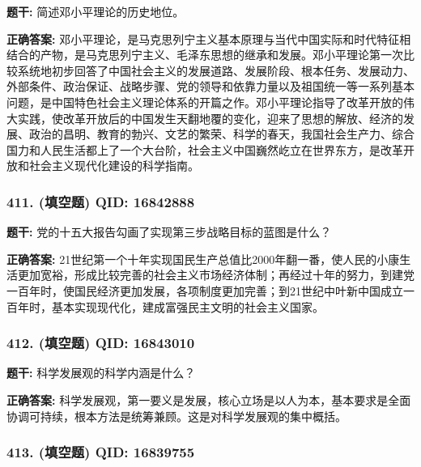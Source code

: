 \documentclass[12pt,UTF8]{ctexart}
\begin{document}
\textbf{题干:}
简述邓小平理论的历史地位。

\textbf{正确答案:}
邓小平理论，是马克思列宁主义基本原理与当代中国实际和时代特征相结合的产物，是马克思列宁主义、毛泽东思想的继承和发展。邓小平理论第一次比较系统地初步回答了中国社会主义的发展道路、发展阶段、根本任务、发展动力、外部条件、政治保证、战略步骤、党的领导和依靠力量以及祖国统一等一系列基本问题，是中国特色社会主义理论体系的开篇之作。邓小平理论指导了改革开放的伟大实践，使改革开放后的中国发生天翻地覆的变化，迎来了思想的解放、经济的发展、政治的昌明、教育的勃兴、文艺的繁荣、科学的春天，我国社会生产力、综合国力和人民生活都上了一个大台阶，社会主义中国巍然屹立在世界东方，是改革开放和社会主义现代化建设的科学指南。

\vspace{0.3em}\hrulefill\vspace{0.7em}

\subsubsection*{411. (填空题) \small QID: 16842888}

\textbf{题干:}
党的十五大报告勾画了实现第三步战略目标的蓝图是什么？

\textbf{正确答案:}
21世纪第一个十年实现国民生产总值比2000年翻一番，使人民的小康生活更加宽裕，形成比较完善的社会主义市场经济体制；再经过十年的努力，到建党一百年时，使国民经济更加发展，各项制度更加完善；到21世纪中叶新中国成立一百年时，基本实现现代化，建成富强民主文明的社会主义国家。

\vspace{0.3em}\hrulefill\vspace{0.7em}

\subsubsection*{412. (填空题) \small QID: 16843010}

\textbf{题干:}
科学发展观的科学内涵是什么？

\textbf{正确答案:}
科学发展观，第一要义是发展，核心立场是以人为本，基本要求是全面协调可持续，根本方法是统筹兼顾。这是对科学发展观的集中概括。

\vspace{0.3em}\hrulefill\vspace{0.7em}

\subsubsection*{413. (填空题) \small QID: 16839755}
\end{document}
